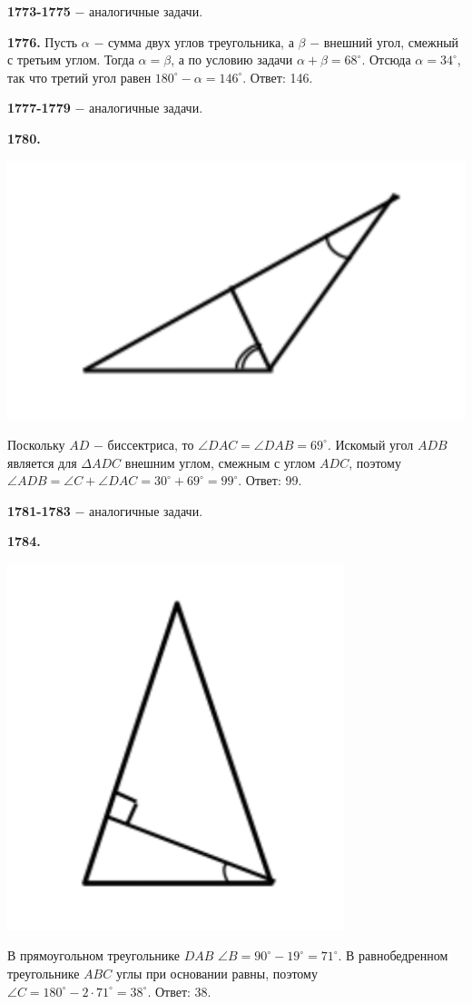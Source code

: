\textbf{1773-1775} $-$ аналогичные задачи.

\textbf{1776.} Пусть $\alpha$ $-$ сумма двух углов треугольника, а $\beta$ $-$ внешний угол, смежный с третьим углом. Тогда $\alpha = \beta$, а по условию задачи $\alpha + \beta = 68^\circ$. Отсюда $\alpha = 34^\circ$, так что  третий угол равен $180^\circ - \alpha = 146^\circ$. \newline \null \hspace*{\fill} Ответ: 146.
 
\textbf{1777-1779} $-$ аналогичные задачи.

\textbf{1780.}

{\centering \includegraphics[width=0.5\linewidth]{Geometry/Content/7.png}
	
}

Поскольку $AD$ $-$ биссектриса, то $\angle DAC = \angle DAB = 69^\circ$. Искомый угол $ADB$ является для $\Delta ADC$ внешним углом, смежным с углом $ADC$, поэтому $\angle ADB = \angle C + \angle DAC = 30^\circ + 69^\circ = 99^\circ.$ \newline \null \hspace*{\fill} Ответ: 99.

\textbf{1781-1783} $-$ аналогичные задачи.

\clearpage 

\textbf{1784.}

{\centering \includegraphics[width=0.4\linewidth]{Geometry/Content/8.png}
	
}

В прямоугольном треугольнике $DAB$ $\angle B = 90^\circ - 19^\circ = 71^\circ$. В равнобедренном треугольнике $ABC$ углы при основании равны, поэтому $\angle C = 180^\circ - 2\cdot 71^\circ = 38^\circ.$ \newline \null \hspace*{\fill} Ответ: 38.

